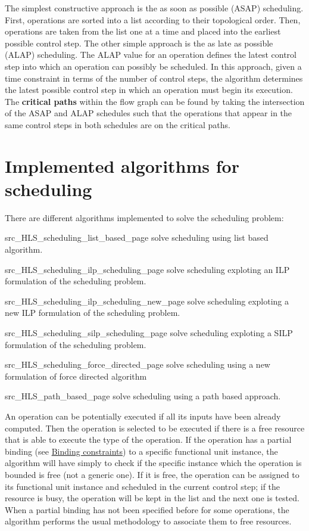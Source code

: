 The simplest constructive approach is the as soon as possible (A\+S\+AP) scheduling. First, operations are sorted into a list according to their topological order. Then, operations are taken from the list one at a time and placed into the earliest possible control step. The other simple approach is the as late as possible (A\+L\+AP) scheduling. The A\+L\+AP value for an operation defines the latest control step into which an operation can possibly be scheduled. In this approach, given a time constraint in terms of the number of control steps, the algorithm determines the latest possible control step in which an operation must begin its execution. The {\bfseries critical paths} within the flow graph can be found by taking the intersection of the A\+S\+AP and A\+L\+AP schedules such that the operations that appear in the same control steps in both schedules are on the critical paths.\hypertarget{src_HLS_scheduling_general_scheduling_algorithm}{}\section{Implemented algorithms for scheduling}\label{src_HLS_scheduling_general_scheduling_algorithm}
There are different algorithms implemented to solve the scheduling problem\+:
\begin{DoxyItemize}
\item src\+\_\+\+H\+L\+S\+\_\+scheduling\+\_\+list\+\_\+based\+\_\+page solve scheduling using list based algorithm.
\item src\+\_\+\+H\+L\+S\+\_\+scheduling\+\_\+ilp\+\_\+scheduling\+\_\+page solve scheduling exploting an I\+LP formulation of the scheduling problem.
\item src\+\_\+\+H\+L\+S\+\_\+scheduling\+\_\+ilp\+\_\+scheduling\+\_\+new\+\_\+page solve scheduling exploting a new I\+LP formulation of the scheduling problem.
\item src\+\_\+\+H\+L\+S\+\_\+scheduling\+\_\+silp\+\_\+scheduling\+\_\+page solve scheduling exploting a S\+I\+LP formulation of the scheduling problem.
\item src\+\_\+\+H\+L\+S\+\_\+scheduling\+\_\+force\+\_\+directed\+\_\+page solve scheduling using a new formulation of force directed algorithm
\item src\+\_\+\+H\+L\+S\+\_\+path\+\_\+based\+\_\+page solve scheduling using a path based approach.
\end{DoxyItemize}

An operation can be potentially executed if all its inputs have been already computed. Then the operation is selected to be executed if there is a free resource that is able to execute the type of the operation. If the operation has a partial binding (see \hyperlink{src_HLS_binding_constraints_page}{Binding constraints}) to a specific functional unit instance, the algorithm will have simply to check if the specific instance which the operation is bounded is free (not a generic one). If it is free, the operation can be assigned to its functional unit instance and scheduled in the current control step; if the resource is busy, the operation will be kept in the list and the next one is tested. When a partial binding has not been specified before for some operations, the algorithm performs the usual methodology to associate them to free resources. 